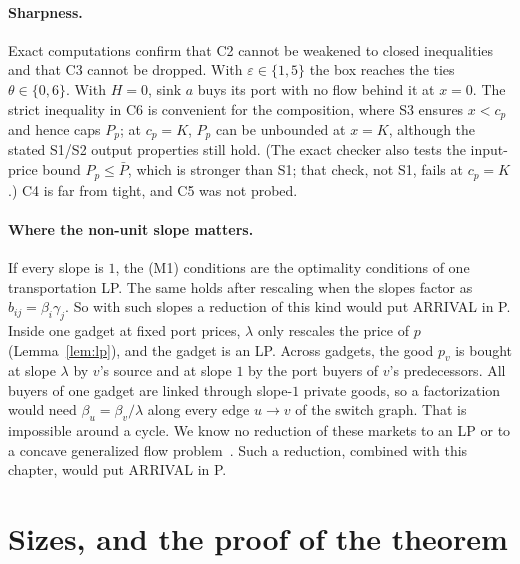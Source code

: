\paragraph{Sharpness.} Exact computations confirm that C2 cannot be weakened to closed inequalities
and that C3 cannot be dropped. With $\varepsilon\in\{1,5\}$
the box reaches the ties $\theta\in\{0,6\}$. With $H=0$, sink $a$ buys its port with no flow behind it at
$x=0$. The strict inequality in C6 is convenient for the composition, where S3 ensures $x<c_p$ and hence
caps $P_p$; at $c_p=K$, $P_p$ can be unbounded at $x=K$, although the stated S1/S2 output properties still
hold. (The exact checker also tests the input-price bound $P_p\le\bar P$, which is stronger than S1; that
check, not S1, fails at $c_p=K$.) C4 is far from tight, and C5 was not probed.

\paragraph{Where the non-unit slope matters.} If every slope is $1$, the (M1) conditions are the
optimality conditions of one transportation LP. The same holds after rescaling when the slopes factor as
$b_{ij}=\beta_i\gamma_j$. So with such slopes a reduction of this kind would put ARRIVAL in P. Inside one gadget at
fixed port prices, $\lambda$ only rescales the price of $p$ (Lemma~\ref{lem:lp}), and the gadget is an LP.
Across gadgets, the good $p_v$ is bought at slope $\lambda$ by $v$'s source and at slope $1$ by the port
buyers of $v$'s predecessors. All buyers of one gadget are linked through slope-$1$ private goods, so a
factorization would need $\beta_u=\beta_v/\lambda$ along every edge $u\to v$ of the switch graph. That
is impossible around a cycle. We know no reduction of these markets to an LP or to a concave generalized
flow problem~\cite{vegh14}. Such a reduction, combined with this chapter, would put ARRIVAL in P.

\section{Sizes, and the proof of the theorem}\label{sec:ar-size}

